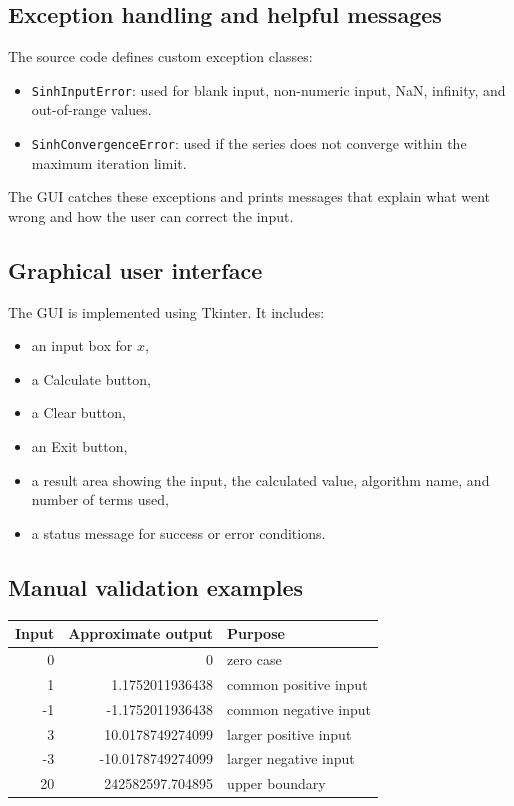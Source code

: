 \documentclass[11pt]{article}
\begin{document}
\subsection{Exception handling and helpful messages}

The source code defines custom exception classes:

\begin{itemize}
    \item \texttt{SinhInputError}: used for blank input, non-numeric input, NaN, infinity, and out-of-range values.
    \item \texttt{SinhConvergenceError}: used if the series does not converge within the maximum iteration limit.
\end{itemize}

The GUI catches these exceptions and prints messages that explain what went wrong and how the user can correct the input.

\subsection{Graphical user interface}

The GUI is implemented using Tkinter. It includes:

\begin{itemize}
    \item an input box for $x$,
    \item a Calculate button,
    \item a Clear button,
    \item an Exit button,
    \item a result area showing the input, the calculated value, algorithm name, and number of terms used,
    \item a status message for success or error conditions.
\end{itemize}

\subsection{Manual validation examples}

\begin{center}
\begin{tabular}{r r l}
\toprule
\textbf{Input} & \textbf{Approximate output} & \textbf{Purpose} \\
\midrule
0 & 0 & zero case \\
1 & 1.1752011936438 & common positive input \\
-1 & -1.1752011936438 & common negative input \\
3 & 10.0178749274099 & larger positive input \\
-3 & -10.0178749274099 & larger negative input \\
20 & 242582597.704895 & upper boundary \\
\bottomrule
\end{tabular}
\end{center}
\end{document}
